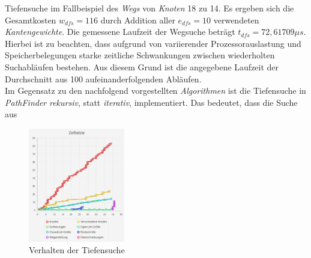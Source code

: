 \documentclass[12pt]{article}
\begin{document}
\noindent Tiefensuche im Fallbeispiel des \textit{Wegs} von \textit{Knoten} 18 zu 14. Es ergeben sich die Gesamtkosten $w_{dfs} = 116$ durch Addition aller $e_{dfs} = 10$ verwendeten \textit{Kantengewichte}. Die gemessene Laufzeit der Wegsuche beträgt $t_{dfs} = 72,61709\mu s$. Hierbei ist zu beachten, dass aufgrund von variierender Prozessorauslastung und Speicherbelegungen starke zeitliche Schwankungen zwischen wiederholten Suchabläufen bestehen. Aus diesem Grund ist die angegebene Laufzeit der Durchschnitt aus 100 aufeinanderfolgenden Abläufen.
\\
Im Gegensatz zu den nachfolgend vorgestellten \textit{Algorithmen} ist die Tiefensuche in \textit{PathFinder} \textit{rekursiv}, statt \textit{iterativ}, implementiert. Das bedeutet, dass die Suche aus
\begin{figure}
\vspace{-20pt}
\begin{center}
\includegraphics[width=0.375\textwidth]{res/dfs_timeV2.png}
\end{center}
\vspace{-30pt}
\centering
\caption{Verhalten der Tiefensuche}
\label{fig:dfs-time}
\end{figure}
\end{document}
